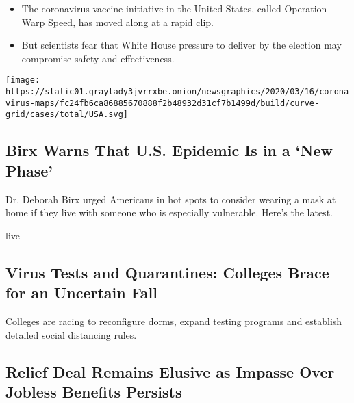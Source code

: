 \begin{itemize}
\tightlist
\item
  The coronavirus vaccine initiative in the United States, called
  Operation Warp Speed, has moved along at a rapid clip.
\item
  But scientists fear that White House pressure to deliver by the
  election may compromise safety and effectiveness.
\end{itemize}

\texttt{[image: https://static01.graylady3jvrrxbe.onion/newsgraphics/2020/03/16/coronavirus-maps/fc24fb6ca86885670888f2b48932d31cf7b1499d/build/curve-grid/cases/total/USA.svg]}

\href{/2020/08/02/world/coronavirus-covid-19.html}{}

\hypertarget{birx-warns-that-us-epidemic-is-in-a-new-phase}{%
\subsection{Birx Warns That U.S. Epidemic Is in a `New
Phase'}\label{birx-warns-that-us-epidemic-is-in-a-new-phase}}

Dr. Deborah Birx urged Americans in hot spots to consider wearing a mask
at home if they live with someone who is especially vulnerable. Here's
the latest.

live

\href{/2020/08/02/us/covid-college-reopening.html}{}

\hypertarget{virus-tests-and-quarantines-colleges-brace-for-an-uncertain-fall}{%
\subsection{Virus Tests and Quarantines: Colleges Brace for an Uncertain
Fall}\label{virus-tests-and-quarantines-colleges-brace-for-an-uncertain-fall}}

Colleges are racing to reconfigure dorms, expand testing programs and
establish detailed social distancing rules.

\href{/2020/08/02/us/politics/coronavirus-jobless-aid.html}{}

\hypertarget{relief-deal-remains-elusive-as-impasse-over-jobless-benefits-persists}{%
\subsection{Relief Deal Remains Elusive as Impasse Over Jobless Benefits
Persists}\label{relief-deal-remains-elusive-as-impasse-over-jobless-benefits-persists}}

